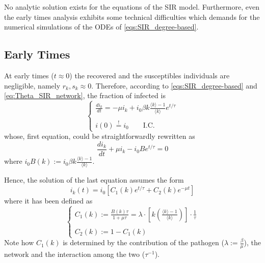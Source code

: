\documentclass[a4paper,10pt,twoside]{book} %
\theoremstyle{definition}
\begin{document}
No analytic solution exists for the equations of the SIR model. Furthermore, even the early times analysis exhibits some technical difficulties which demands for the numerical simulations of the ODEs of \autoref{eqs:SIR_degree-based}.

\subsection*{Early Times}
At early times ($t\approx 0$) the recovered and the susceptibles individuals are negligible, namely $r_k, s_k\approx0$. Therefore, according to \autoref{eqs:SIR_degree-based} and \autoref{eq:Theta_SIR_network}, the fraction of infected is \vspace{3mm}
\begin{equation}
	\begin{cases}
		\frac{di_k}{dt} = - \mu i_k + i_0 \beta k \frac{\langle k \rangle -1}{\langle k \rangle } e^{t/\tau} \\ \\
		i(0) \stackrel{!}{=} i_0 \qquad \text{I.C.}
	\end{cases}
\end{equation}
whose, first equation, could be straightforwardly rewritten as
\begin{equation}
	\frac{d i_k}{dt} + \mu i_k - i_0 B e^{t/\tau} = 0
\end{equation}
where $i_0 B(k) := i_0 \beta k \frac{\langle k \rangle -1}{\langle k \rangle }$.

Hence, the solution of the last equation assumes the form
\begin{equation}
	i_k(t)=i_0 \left[C_1(k)e^{t/\tau} + C_2(k) e^{-\mu t}\right]
\end{equation}
where it has been defined as \vspace{3mm}
\begin{equation*}
	\begin{cases}
		C_1(k):= \frac{B(k) \tau}{1+ \mu \tau} = \lambda \cdot \left[k\left(\frac{\langle k \rangle -1}{\langle k \rangle }\right)\right]
		\cdot \frac{1}{\tau} \\ \\
		C_2(k):= 1 - C_1(k)
	\end{cases}
\end{equation*}
Note how $C_1(k)$ is determined by the contribution of the pathogen ($\lambda:=\frac{\beta}{\mu}$), the network and the interaction among the two ($\tau^{-1}$).
\end{document}
